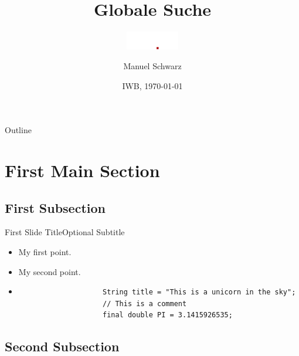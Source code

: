 \documentclass{beamer}
\title{Globale Suche}
\subtitle{\includegraphics[height=8mm]{../img/studip-logo@2x}}
\author{Manuel Schwarz}
\institute[Uni Osnabrück]{\inst{} virtUOS\\ Universität Osnabrück}
\date{IWB, \today}
\begin{document}
\begin{frame}
    \titlepage
\end{frame}


\begin{frame}{Outline}
    \tableofcontents
\end{frame}

\section{First Main Section}

\subsection{First Subsection}

\begin{frame}[fragile]{First Slide Title}{Optional Subtitle}
    \begin{itemize}
        \item {My first point.\pause}
        \item {My second point.\pause}
        \item[]{\begin{verbatim}
                    String title = "This is a unicorn in the sky";
                    // This is a comment
                    final double PI = 3.1415926535;
                \end{verbatim}
        }
    \end{itemize}
\end{frame}

\subsection{Second Subsection}
\end{document}
